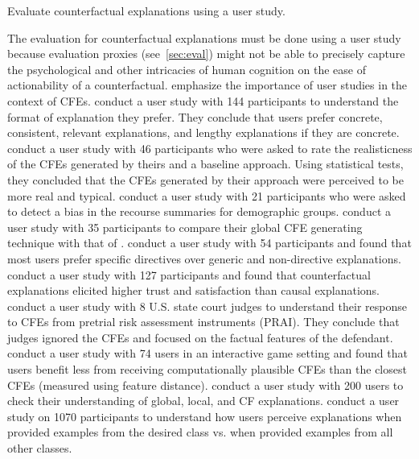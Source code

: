 \begin{challenge}\label{ch:user-study}
Evaluate counterfactual explanations using a user study. 
\end{challenge}
The evaluation for counterfactual explanations must be done using a user study because evaluation proxies (see~\cref{sec:eval}) might not be able to precisely capture the psychological and other intricacies of human cognition on the ease of actionability of a counterfactual. \citet{if_only_better_CFE_keane} emphasize the importance of user studies in the context of CFEs. 
\progress
\citet{forster2020evaluating-xai-user-study} conduct a user study with 144 participants to understand the format of explanation they prefer. They conclude that users prefer concrete, consistent, relevant explanations, and lengthy explanations if they are concrete. 
\citet{forster-capturing-2021} conduct a user study with 46 participants who were asked to rate the realisticness of the CFEs generated by theirs and a baseline approach. Using statistical tests, they concluded that the CFEs generated by their approach were perceived to be more real and typical. 
\citet{hima-beyond-recourse-globalcfe} conduct a user study with 21 participants who were asked to detect a bias in the recourse summaries for demographic groups. 
\citet{kanamori-decision-tree-globalcfe} conduct a user study with 35 participants to compare their global CFE generating technique with that of \citet{hima-beyond-recourse-globalcfe}. 
\citet{sequential-CFE} conduct a user study with 54 participants and found that most users prefer specific directives over generic and non-directive explanations. 
\citet{user-study-cfe-causal-diff-keane} conduct a user study with 127 participants and found that counterfactual explanations elicited higher trust and satisfaction than causal explanations. 
\citet{CFE-user-study-judges} conduct a user study with 8 U.S. state court judges to understand their response to CFEs from pretrial risk assessment instruments (PRAI). They conclude that judges ignored the CFEs and focused on the factual features of the defendant. 
\citet{keep-your-friends-close-cfe} conduct a user study with 74 users in an interactive game setting and found that users benefit less from receiving computationally plausible CFEs than the closest CFEs (measured using feature distance). 
\citet{Zhang-CFE-user-study} conduct a user study with 200 users to check their understanding of global, local, and CF explanations. 
\citet{cfe-user-study-quickdraw} conduct a user study on 1070 participants to understand how users perceive explanations when provided examples from the desired class vs. when provided examples from all other classes. 


